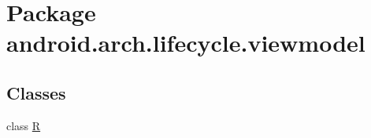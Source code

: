 \hypertarget{namespaceandroid_1_1arch_1_1lifecycle_1_1viewmodel}{}\section{Package android.\+arch.\+lifecycle.\+viewmodel}
\label{namespaceandroid_1_1arch_1_1lifecycle_1_1viewmodel}
\subsection*{Classes}
\begin{DoxyCompactItemize}
\item 
class \mbox{\hyperlink{classandroid_1_1arch_1_1lifecycle_1_1viewmodel_1_1_r}{R}}
\end{DoxyCompactItemize}
